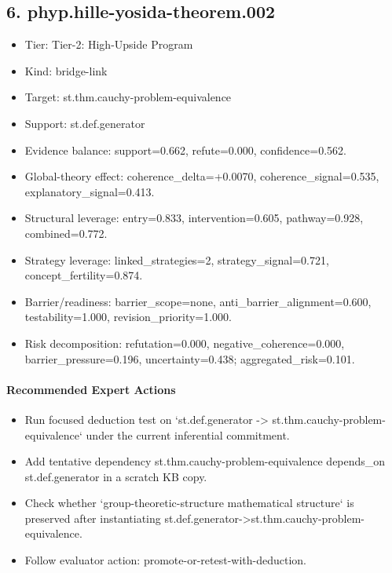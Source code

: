 \documentclass[11pt]{article}
\begin{document}
\subsection*{6. phyp.hille-yosida-theorem.002}
\begin{itemize}
\item Tier: Tier-2: High-Upside Program
\item Kind: bridge-link
\item Target: st.thm.cauchy-problem-equivalence
\item Support: st.def.generator
\item Evidence balance: support=0.662, refute=0.000, confidence=0.562.
\item Global-theory effect: coherence\_delta=+0.0070, coherence\_signal=0.535, explanatory\_signal=0.413.
\item Structural leverage: entry=0.833, intervention=0.605, pathway=0.928, combined=0.772.
\item Strategy leverage: linked\_strategies=2, strategy\_signal=0.721, concept\_fertility=0.874.
\item Barrier/readiness: barrier\_scope=none, anti\_barrier\_alignment=0.600, testability=1.000, revision\_priority=1.000.
\item Risk decomposition: refutation=0.000, negative\_coherence=0.000, barrier\_pressure=0.196, uncertainty=0.438; aggregated\_risk=0.101.
\end{itemize}
\paragraph{Recommended Expert Actions}
\begin{itemize}
\item Run focused deduction test on `st.def.generator -> st.thm.cauchy-problem-equivalence` under the current inferential commitment.
\item Add tentative dependency st.thm.cauchy-problem-equivalence depends\_on st.def.generator in a scratch KB copy.
\item Check whether `group-theoretic-structure mathematical structure` is preserved after instantiating st.def.generator->st.thm.cauchy-problem-equivalence.
\item Follow evaluator action: promote-or-retest-with-deduction.
\end{itemize}
\end{document}
